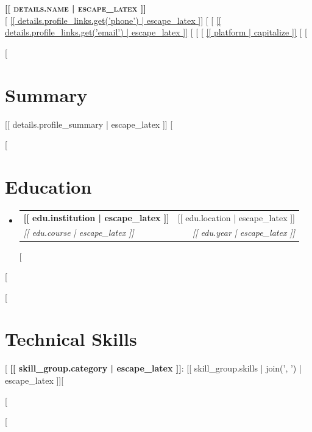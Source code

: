 \documentclass[letterpaper,11pt]{article}
\makeatletter
\newcommand{\resumeSubheading}[4]{
  \vspace{-2pt}\item
  \begin{tabular*}{0.97\textwidth}[t]{l@{\extracolsep{\fill}}r}
    \textbf{#1} & #2 \\
    \textit{\small#3} & \textit{\small #4} \\
  \end{tabular*}\vspace{-7pt}
}
\newcommand{\resumeSubHeadingListStart}{\begin{itemize}[leftmargin=0.15in, label={}]}
\newcommand{\resumeSubHeadingListEnd}{\end{itemize}}
\makeatother
\begin{document}
\begin{center}
  \textbf{\Huge \scshape [[ details.name | escape_latex ]]} \\ \vspace{1pt}
  \small
    [%
    \href{tel:[[ details.profile_links.get('phone') ]]}{[[ details.profile_links.get('phone') | escape_latex ]]}
    [%
    [%
    \href{mailto:[[ details.profile_links.get('email') ]]}{\underline{[[ details.profile_links.get('email') | escape_latex ]]}}
    [%
    [%
    [%
    \href{[% if url.startswith('http') %][[ url ]][% else %]https://[[ url ]][% endif %]}{\underline{[[ platform | capitalize ]]}}
    [%
    [%
\end{center}

[%
\section{Summary}
\small [[ details.profile_summary | escape_latex ]]
\vspace{-5pt}
[%

[%
\section{Education}
  \resumeSubHeadingListStart
    [%
    \resumeSubheading
      {[[ edu.institution | escape_latex ]]}{[[ edu.location | escape_latex ]]}
      {[[ edu.course | escape_latex ]]}{[[ edu.year | escape_latex ]]}
    [%
  \resumeSubHeadingListEnd
[%

[%
\section{Technical Skills}
 \begin{itemize}[leftmargin=0.15in, label={}]
    \small{\item{
    [%
     \textbf{[[ skill_group.category | escape_latex ]]}{: [[ skill_group.skills | join(', ') | escape_latex ]]}[%

    [%
    }}
 \end{itemize}
[%
\end{document}
